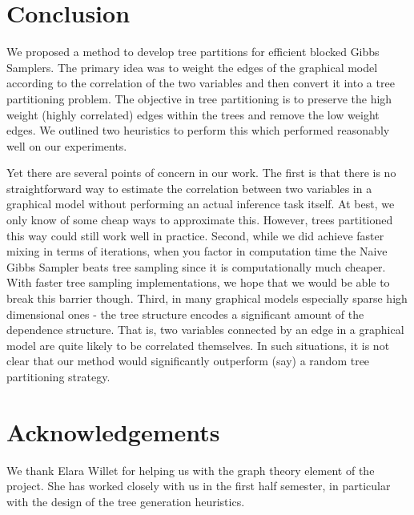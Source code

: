 \documentclass{article} %
\begin{document}
\section{Conclusion}

We proposed a method to develop tree partitions for efficient blocked Gibbs
Samplers. The primary idea was to weight the edges of the graphical model
according to the correlation of the two variables and then convert it into a
tree partitioning problem. The objective in tree partitioning is to preserve the
high weight (highly correlated) edges within the trees and remove the low
weight edges. We outlined two heuristics to perform this which performed
reasonably well on our experiments.

Yet there are several points of concern in our work. The first is that there
is no straightforward way to estimate the correlation between two variables in a
graphical model without performing an actual inference task itself. At best, we
only know of some cheap ways to approximate this. However, trees partitioned
this way could still work well in practice. Second, while we did achieve faster
mixing in terms of iterations, when you factor in computation time the Naive
Gibbs Sampler beats tree sampling since it is computationally much cheaper. With
faster tree sampling implementations, we hope that we would be able to break
this barrier though.
Third, in many graphical models
especially sparse high dimensional ones - the tree structure encodes a
significant amount of the dependence structure. That is, two variables connected
by an edge in a graphical model are quite likely to be correlated themselves. In
such situations, it is not clear that our method would significantly outperform
(say) a random tree partitioning strategy.

\section*{Acknowledgements}
\label{sec:acknowledgement}
We thank Elara Willet for helping us with the graph theory element of
the project. She has worked closely with us in the first half
semester, in particular with the design of the tree generation heuristics.

 
     
\end{document}

